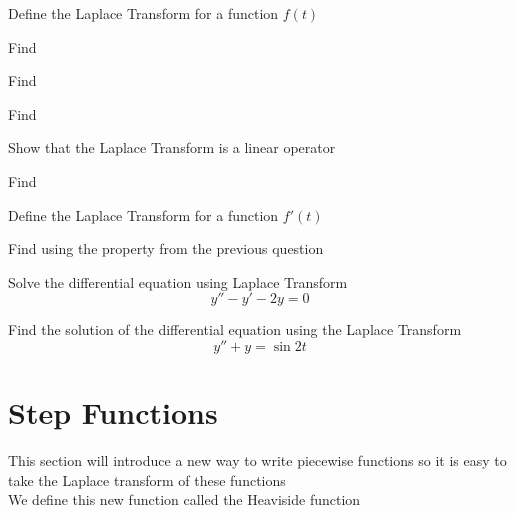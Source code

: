 	\begin{q}
		Define the Laplace Transform for a function $ f(t) $
	\end{q}
	\begin{q}
		Find 
	\end{q}
	\begin{q}
		Find \laplace{e^{at}}
	\end{q}
	\begin{q}
		Find \laplace{\sin at}
	\end{q}
	\begin{q}
		Show that the Laplace Transform is a linear operator
	\end{q}
	\begin{q}
		Find \laplace{5e^{-2t} - 3 \sin 4t}
	\end{q}
	\begin{q}
		Define the Laplace Transform for a function $ f'(t) $
	\end{q}
	\begin{q}
		Find  using the property from the previous question 
	\end{q}
	\begin{q}
		Solve the differential equation using Laplace Transform \[ y'' - y' - 2y = 0 \]
	\end{q}
	\begin{q}
		Find the solution of the differential equation using the Laplace Transform\[ y'' + y = \sin 2t \]
	\end{q}

\section{Step Functions}
This section will introduce a new way to write piecewise functions so it is easy to take the Laplace transform of these functions \\
We define this new function called the Heaviside function

